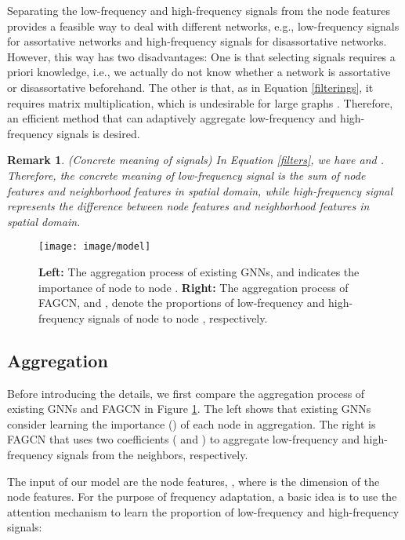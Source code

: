 \documentclass[letterpaper]{article} \usepackage{aaai21}  \usepackage{times}  \usepackage{helvet} \usepackage{courier}  \usepackage[hyphens]{url}  \usepackage{graphicx} \urlstyle{rm} \def\UrlFont{\rm}  \usepackage{natbib}  \usepackage{caption} \frenchspacing  \setlength{\pdfpagewidth}{8.5in}  \setlength{\pdfpageheight}{11in}
\newtheorem{remark}{Remark}
\begin{document}
Separating the low-frequency and high-frequency signals from the node features provides a feasible way to deal with different networks, e.g., low-frequency signals for assortative networks and high-frequency signals for disassortative networks.
However, this way has two disadvantages: One is that selecting signals requires a priori knowledge, i.e., we actually do not know whether a network is assortative or disassortative beforehand. The other is that, as in Equation \ref{filterings}, it requires matrix multiplication, which is undesirable for large graphs \cite{GraphSAGE}.
Therefore, an efficient method that can adaptively aggregate low-frequency and high-frequency signals is desired.



\begin{remark}
\label{rema}
	(Concrete meaning of signals)
	In Equation \ref{filters}, we have  and . 
	Therefore, the concrete meaning of low-frequency signal  is the sum of node features and neighborhood features in spatial domain, while high-frequency signal  represents the difference between node features and neighborhood features in spatial domain.
\end{remark}

\begin{figure}
\centering
\texttt{[image: image/model]}
\caption{\textbf{Left:} The aggregation process of existing GNNs, and  indicates the importance of node  to node . \textbf{Right:} The aggregation process of FAGCN, and ,  denote the proportions of low-frequency and high-frequency signals of node  to node , respectively.}
\label{model}
\end{figure}

\subsection{Aggregation}
Before introducing the details, we first compare the aggregation process of existing GNNs and FAGCN in Figure \ref{model}. The left shows that existing GNNs consider learning the importance () of each node in aggregation. The right is FAGCN that uses two coefficients ( and ) to aggregate low-frequency and high-frequency signals from the neighbors, respectively.

The input of our model are the node features, , where  is the dimension of the node features.
For the purpose of frequency adaptation, a basic idea is to use the attention mechanism to learn the proportion of low-frequency and high-frequency signals:
\end{document}
